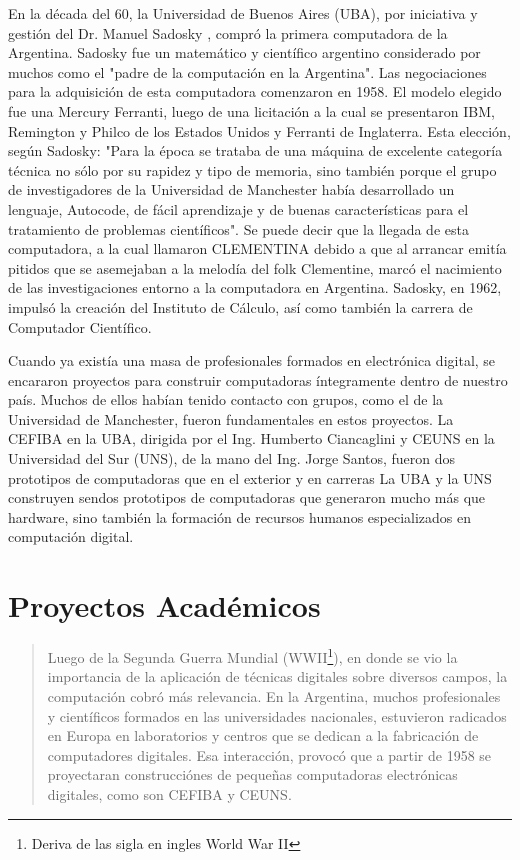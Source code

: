 \documentclass[%
 	final,
%
	notitlepage,
	narroweqnarray,
	inline,
 	twoside,
	]{ieee}
\begin{document}
En la d\'ecada del 60, la Universidad de Buenos Aires (UBA), por iniciativa y gesti\'on del Dr. Manuel Sadosky \cite{sadosky}, compr\'o la primera computadora de la Argentina. Sadosky fue un matem\'atico y cient\'ifico argentino considerado por muchos como el "padre de la computaci\'on en la Argentina".
Las negociaciones para la adquisici\'on de esta computadora comenzaron en 1958. El modelo elegido fue una Mercury Ferranti, luego de una licitaci\'on a la cual se presentaron IBM, Remington y Philco de los Estados Unidos y Ferranti de Inglaterra. Esta elecci\'on, seg\'un Sadosky: "Para la \'epoca se trataba de una m\'aquina de excelente categor\'ia t\'ecnica no s\'olo por su rapidez y tipo de memoria, sino tambi\'en porque el grupo de investigadores de la Universidad de Manchester hab\'ia desarrollado un lenguaje, Autocode, de f\'acil aprendizaje y de buenas caracter\'isticas para el tratamiento de problemas cient\'ificos".
Se puede decir que la llegada de esta computadora, a la cual llamaron CLEMENTINA  debido a que al arrancar emit\'ia pitidos que se asemejaban a la melod\'ia del folk Clementine, marc\'o el nacimiento de las investigaciones entorno a la computadora en Argentina.
Sadosky, en 1962, impuls\'o la creaci\'on del Instituto de C\'alculo, as\'i como tambi\'en la carrera de Computador Cient\'ifico.

Cuando ya exist\'ia una masa de profesionales formados en electr\'onica digital, se encararon proyectos para construir computadoras \'integramente dentro de nuestro pa\'is. Muchos de ellos hab\'ian tenido contacto con grupos, como el de la Universidad de Manchester, fueron fundamentales en estos proyectos. La CEFIBA en la UBA, dirigida por el Ing. Humberto Ciancaglini y CEUNS en la Universidad del Sur (UNS), de la mano del Ing. Jorge Santos, fueron dos prototipos de computadoras que en el exterior y en carreras La UBA y la UNS construyen sendos prototipos de computadoras que generaron mucho m\'as que hardware, sino tambi\'en la formaci\'on de recursos humanos especializados en computaci\'on digital.

\section{Proyectos Acad\'emicos}
\begin{quote}
Luego de la Segunda Guerra Mundial (WWII\footnote{Deriva de las sigla en ingles World War II}), en donde se vio la importancia de la aplicaci\'on de t\'ecnicas digitales sobre diversos campos, la computaci\'on cobr\'o m\'as relevancia. En la Argentina, muchos profesionales y cient\'ificos formados en las universidades nacionales, estuvieron radicados en Europa en laboratorios y centros que se dedican a la fabricaci\'on de computadores digitales. Esa interacci\'on, provoc\'o que a partir de 1958 se proyectaran construcci\'ones de peque\~nas computadoras electr\'onicas digitales, como son CEFIBA y CEUNS.
\end{quote}
\end{document}
